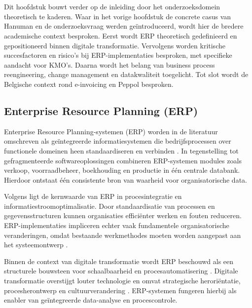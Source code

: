 \chapter{}%
\label{ch:stand-van-zaken}

Dit hoofdstuk bouwt verder op de inleiding door het onderzoeksdomein theoretisch te kaderen. Waar in het vorige hoofdstuk de concrete casus van Hanuman en de onderzoeksvraag werden geïntroduceerd, wordt hier de bredere academische context besproken. Eerst wordt ERP theoretisch gedefinieerd en gepositioneerd binnen digitale transformatie. Vervolgens worden kritische succesfactoren en risico’s bij ERP-implementaties besproken, met specifieke aandacht voor KMO’s. Daarna wordt het belang van business process reengineering, change management en datakwaliteit toegelicht. Tot slot wordt de Belgische context rond e-invoicing en Peppol besproken.

\section{Enterprise Resource Planning (ERP)}

Enterprise Resource Planning-systemen (ERP) worden in de literatuur omschreven als geïntegreerde informatiesystemen die bedrijfsprocessen over functionele domeinen heen standaardiseren en verbinden \textcite{Davenport1998}. In tegenstelling tot gefragmenteerde softwareoplossingen combineren ERP-systemen modules zoals verkoop, voorraadbeheer, boekhouding en productie in één centrale databank. Hierdoor ontstaat één consistente bron van waarheid voor organisatorische data.

Volgens \textcite{Umble2003} ligt de kernwaarde van ERP in procesintegratie en informatiestroomoptimalisatie. Door standaardisatie van processen en gegevensstructuren kunnen organisaties efficiënter werken en fouten reduceren. ERP-implementaties impliceren echter vaak fundamentele organisatorische veranderingen, omdat bestaande werkmethodes moeten worden aangepast aan het systeemontwerp \autocite{Davenport1998}.

Binnen de context van digitale transformatie wordt ERP beschouwd als een structurele bouwsteen voor schaalbaarheid en procesautomatisering \autocite{Matt2015}. Digitale transformatie overstijgt louter technologie en omvat strategische heroriëntatie, procesherontwerp en cultuurverandering \autocite{Vial2019}. ERP-systemen fungeren hierbij als enabler van geïntegreerde data-analyse en procescontrole.

